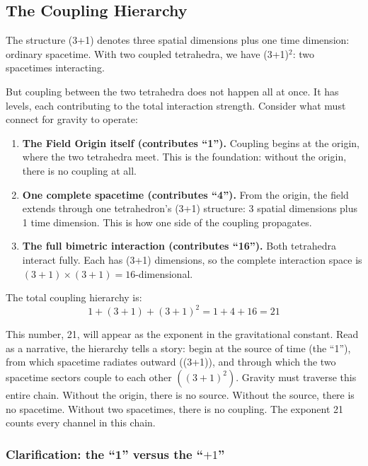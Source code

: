 \documentclass[aps,prd,preprint,superscriptaddress,showpacs,preprintnumbers,amsmath,amssymb,nofootinbib]{revtex4-2}
\begin{document}
\subsection{The Coupling Hierarchy}
\label{subsec:hierarchy}

The structure (3+1) denotes three spatial dimensions plus one time dimension: ordinary spacetime. With two coupled tetrahedra, we have (3+1)$^2$: two spacetimes interacting.

But coupling between the two tetrahedra does not happen all at once. It has levels, each contributing to the total interaction strength. Consider what must connect for gravity to operate:

\begin{enumerate}
\item \textbf{The Field Origin itself (contributes ``1'').} Coupling begins at the origin, where the two tetrahedra meet. This is the foundation: without the origin, there is no coupling at all.
\item \textbf{One complete spacetime (contributes ``4'').} From the origin, the field extends through one tetrahedron's (3+1) structure: 3 spatial dimensions plus 1 time dimension. This is how one side of the coupling propagates.
\item \textbf{The full bimetric interaction (contributes ``16'').} Both tetrahedra interact fully. Each has (3+1) dimensions, so the complete interaction space is $(3+1) \times (3+1) = 16$-dimensional.
\end{enumerate}

The total coupling hierarchy is:
\begin{equation}
1 + (3+1) + (3+1)^2 = 1 + 4 + 16 = 21
\label{eq:hierarchy}
\end{equation}

This number, 21, will appear as the exponent in the gravitational constant. Read as a narrative, the hierarchy tells a story: begin at the source of time (the ``1''), from which spacetime radiates outward ((3+1)), and through which the two spacetime sectors couple to each other $((3+1)^2)$. Gravity must traverse this entire chain. Without the origin, there is no source. Without the source, there is no spacetime. Without two spacetimes, there is no coupling. The exponent 21 counts every channel in this chain.

\subsubsection*{Clarification: the ``1'' versus the ``$+1$''}
\end{document}
